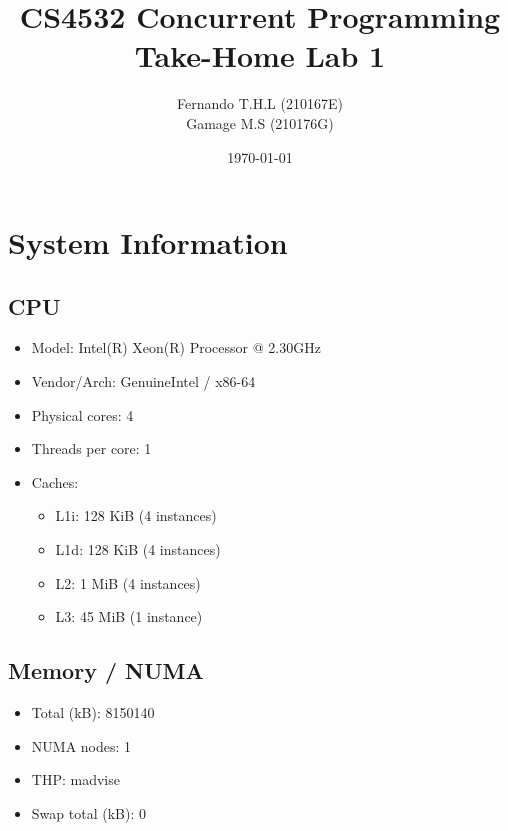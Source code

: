 \documentclass{article}
\title{CS4532 Concurrent Programming \\ \large Take-Home Lab 1}
\author{Fernando T.H.L (210167E) \\ Gamage M.S (210176G)}
\date{\today}
\begin{document}
\maketitle
\section*{System Information}
\noindent
\begin{minipage}[t]{0.48\textwidth}
\subsection*{CPU}
\begin{itemize}[noitemsep,topsep=0pt]
  \item Model: Intel(R) Xeon(R) Processor @ 2.30GHz
  \item Vendor/Arch: GenuineIntel / x86-64
  \item Physical cores: 4
  \item Threads per core: 1
  \item Caches:
  \begin{itemize}[noitemsep,topsep=0pt,leftmargin=*]
    \item L1i: 128 KiB (4 instances)
    \item L1d: 128 KiB (4 instances)
    \item L2:  1 MiB (4 instances)
    \item L3:  45 MiB (1 instance)
  \end{itemize}
\end{itemize}
\subsection*{Memory / NUMA}
\begin{itemize}[noitemsep,topsep=0pt]
  \item Total (kB): 8150140
  \item NUMA nodes: 1
  \item THP: madvise
  \item Swap total (kB): 0
\end{itemize}
\end{minipage}
\hfill
\end{document}
